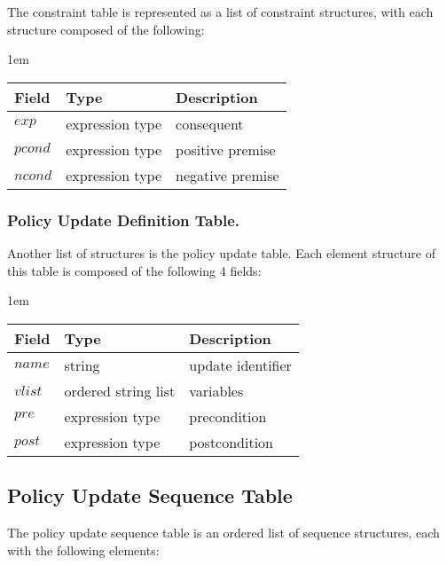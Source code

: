 \documentclass[global,twocolumn,final]{svjour}
\newenvironment{vquote}
  {\begin{list}{}{\leftmargin 1em}\item[]}
  {\end{list}}
\begin{document}
        The constraint table is represented as a list of constraint
        structures, with each structure composed of the following:

        \begin{vquote}
          \begin{tabular}[t]{|l|l|l|}
            \hline
            \textbf{Field} & \textbf{Type} & \textbf{Description} \\
            \hline
            $exp$ & expression type & consequent \\
            \hline
            $pcond$ & expression type & positive premise \\
            \hline
            $ncond$ & expression type & negative premise \\
            \hline
          \end{tabular}
        \end{vquote}

      \subsubsection{Policy Update Definition Table.}

        Another list of structures is the policy update table. Each element
        structure of this table is composed of the following 4 fields:

        \begin{vquote}
          \begin{tabular}[t]{|l|l|l|}
            \hline
            \textbf{Field} & \textbf{Type} & \textbf{Description} \\
            \hline
            $name$ & string & update identifier \\
            \hline
            $vlist$ & ordered string list & variables \\
            \hline
            $pre$ & expression type & precondition \\
            \hline
            $post$ & expression type & postcondition \\
            \hline
          \end{tabular}
        \end{vquote}

    \subsection{Policy Update Sequence Table}

      The policy update sequence table is an ordered list of sequence
      structures, each with the following elements:
\end{document}
